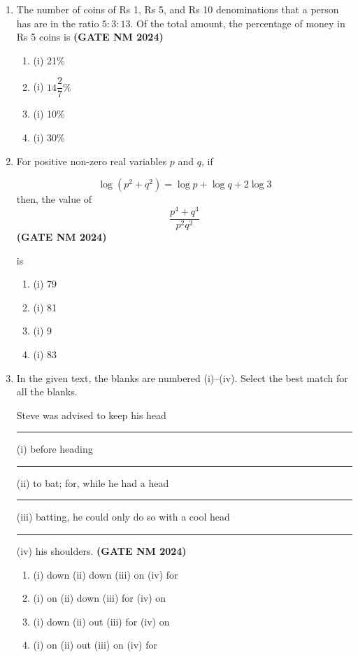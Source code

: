 \documentclass[journal,15pt,onecolumn]{IEEEtran}
\theoremstyle{remark}
\begin{document}
\begin{enumerate}
    
    \item  The number of coins of  Rs 1, Rs 5, and Rs 10 denominations that a person has are in the ratio $5:3:13$.  
    Of the total amount, the percentage of money in Rs 5 coins is\hfill \textbf{ (GATE NM 2024)}
    
    \begin{enumerate}
        \item (i) 21\%
        \item (i) $14 \dfrac{2}{7}\%$
        \item (i) 10\%
        \item (i) 30\%
    \end{enumerate}
    

    \item   For positive non-zero real variables $p$ and $q$, if
    
     $$  \log \left(p^{2} + q^{2}\right) = \log p + \log q + 2 \log 3 $$
    then, the value of $$ \frac{p^{4} + q^{4}}{p^{2}q^{2}}$$\hfill \textbf{ (GATE NM 2024)}
    
    is
    \begin{enumerate}
        \item (i) 79
        \item (i) 81
        \item (i) 9
        \item (i) 83
    \end{enumerate}


\item  In the given text, the blanks are numbered (i)--(iv). Select the best match for all the blanks.

  Steve was advised to keep his head \rule{1cm}{0.15mm} (i) before heading \rule{1cm}{0.15mm} (ii) to bat; for, while he had a head \rule{1cm}{0.15mm} (iii) batting, he could only do so with a cool head \rule{1cm}{0.15mm} (iv) his shoulders.\hfill \textbf{ (GATE NM 2024)}

    \begin{enumerate}
        \item (i)  down \quad(ii) down \quad (iii) on \quad (iv) for
        \item (i)  on \quad(ii) down \quad (iii) for \quad  (iv) on
        \item (i)  down \quad(ii) out \quad (iii) for \quad (iv) on
        \item (i)  on \quad(ii) out \quad (iii) on \quad  (iv) for
    \end{enumerate}




\end{enumerate}
\end{document}
